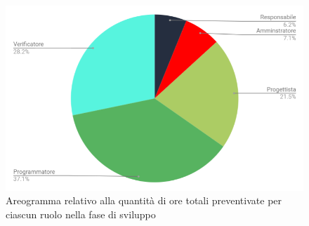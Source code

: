 \begin{figure}[h!]
	\centering
	\caption{Areogramma relativo alla quantità di ore totali preventivate per ciascun ruolo nella fase di sviluppo}
    \includegraphics[scale=0.60]{./src/Preventivo/src/img/TortaSviluppo.png}  
\end{figure}

